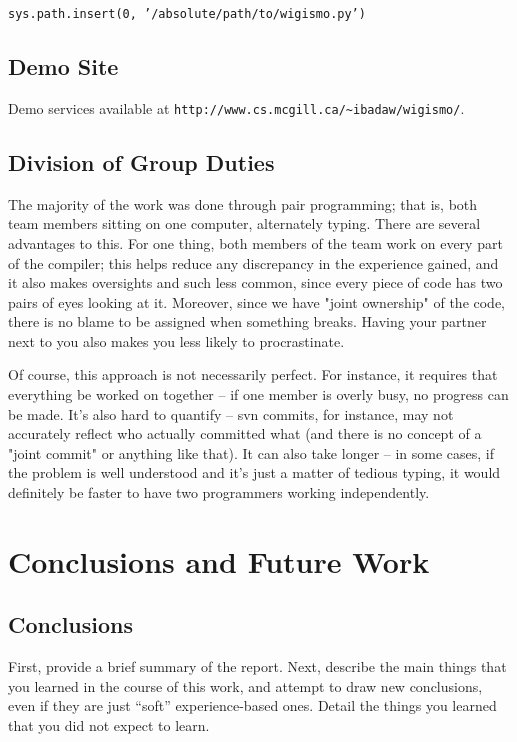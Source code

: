 \documentclass{WigReport}
\begin{document}
{\tt sys.path.insert(0, '/absolute/path/to/wigismo.py')}

\subsection{Demo Site}
Demo services available at 
{\tt http://www.cs.mcgill.ca/\textasciitilde ibadaw/wigismo/}.

\subsection{Division of Group Duties}
The majority of the work was done through pair programming; that is,
both team members sitting on one computer, alternately typing. There are
several advantages to this. For one thing, both members of the team work
on every part of the compiler; this helps reduce any discrepancy in the
experience gained, and it also makes oversights and such less common, since
every piece of code has two pairs of eyes looking at it. Moreover, since
we have "joint ownership" of the code, there is no blame to be assigned
when something breaks. Having your partner next to you also makes you less
likely to procrastinate. 

Of course, this approach is not necessarily perfect. For instance, it
requires that everything be worked on together -- if one member is overly
busy, no progress can be made. It's also hard to quantify -- svn commits,
for instance, may not accurately reflect who actually committed what (and
there is no concept of a "joint commit" or anything like that). It can also
take longer -- in some cases, if the problem is well understood and it's
just a matter of tedious typing, it would definitely be faster to have
two programmers working independently.

\clearpage

\section{Conclusions and Future Work}
\subsection{Conclusions}
First, provide a brief summary of the report.  Next, describe the main
things that you learned in the course of this work, and attempt to
draw new conclusions, even if they are just ``soft'' experience-based
ones.  Detail the things you learned that you did not expect to learn.
\end{document}
